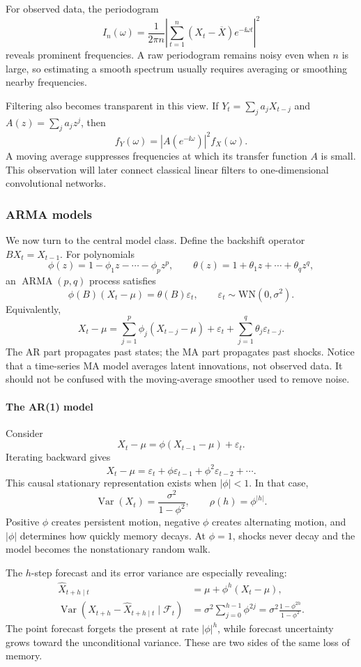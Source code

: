 For observed data, the periodogram
\[
    I_n(\omega)
    =\frac{1}{2\pi n}
      \left|\sum_{t=1}^n(X_t-\overline{X})e^{-\ii\omega t}\right|^2
\]
reveals prominent frequencies. A raw periodogram remains noisy even when $n$ is
large, so estimating a smooth spectrum usually requires averaging or smoothing
nearby frequencies.

Filtering also becomes transparent in this view. If
$Y_t=\sum_j a_jX_{t-j}$ and $A(z)=\sum_j a_jz^j$, then
\[
    f_Y(\omega)=|A(e^{-\ii\omega})|^2f_X(\omega).
\]
A moving average suppresses frequencies at which its transfer function $A$ is
small. This observation will later connect classical linear filters to
one-dimensional convolutional networks.

\subsubsection{ARMA models}
We now turn to the central model class. Define the backshift operator
$BX_t=X_{t-1}$. For polynomials
\[
    \phi(z)=1-\phi_1z-\cdots-\phi_pz^p,
    \qquad
    \theta(z)=1+\theta_1z+\cdots+\theta_qz^q,
\]
an $\operatorname{ARMA}(p,q)$ process satisfies
\[
    \phi(B)(X_t-\mu)=\theta(B)\varepsilon_t,
    \qquad \varepsilon_t\sim\mathrm{WN}(0,\sigma^2).
\]
Equivalently,
\[
    X_t-\mu
    =\sum_{j=1}^p\phi_j(X_{t-j}-\mu)
     +\varepsilon_t+\sum_{j=1}^q\theta_j\varepsilon_{t-j}.
\]
The AR part propagates past states; the MA part propagates past shocks. Notice
that a time-series MA model averages latent innovations, not observed data. It
should not be confused with the moving-average smoother used to remove noise.

\paragraph{The AR(1) model}
\hspace{0.55em}Consider
\[
    X_t-\mu=\phi(X_{t-1}-\mu)+\varepsilon_t.
\]
Iterating backward gives
\[
    X_t-\mu
    =\varepsilon_t+\phi\varepsilon_{t-1}+\phi^2\varepsilon_{t-2}+\cdots.
\]
This causal stationary representation exists when $|\phi|<1$. In that case,
\[
    \operatorname{Var}(X_t)=\frac{\sigma^2}{1-\phi^2},
    \qquad
    \rho(h)=\phi^{|h|}.
\]
Positive $\phi$ creates persistent motion, negative $\phi$ creates alternating
motion, and $|\phi|$ determines how quickly memory decays. At $\phi=1$, shocks
never decay and the model becomes the nonstationary random walk.

The $h$-step forecast and its error variance are especially revealing:
\[
\begin{aligned}
    \widehat{X}_{t+h\mid t}
        &=\mu+\phi^h(X_t-\mu),\\
    \operatorname{Var}(X_{t+h}-\widehat{X}_{t+h\mid t}\mid\mathcal{F}_t)
        &=\sigma^2\sum_{j=0}^{h-1}\phi^{2j}
          =\sigma^2\frac{1-\phi^{2h}}{1-\phi^2}.
\end{aligned}
\]
The point forecast forgets the present at rate $|\phi|^h$, while forecast
uncertainty grows toward the unconditional variance. These are two sides of the
same loss of memory.

